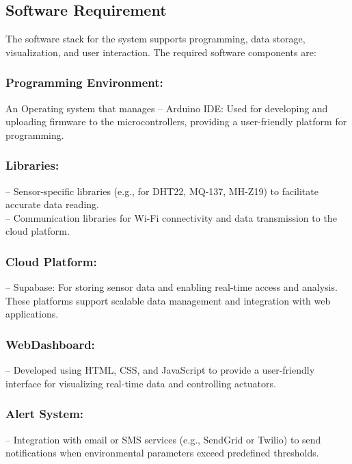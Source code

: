 \documentclass[../main.tex]{subfiles}
\begin{document}
\subsection{Software Requirement}  The software stack for the system supports programming, data storage, visualization, and user interaction. The required software components are:
    \subsubsection{Programming Environment:} An Operating system that manages – Arduino IDE: Used for developing and uploading firmware to the microcontrollers, providing a user-friendly platform for programming.

    \subsubsection{Libraries:}
    – Sensor-specific libraries (e.g., for DHT22, MQ-137, MH-Z19) to facilitate accurate
 data reading.\\
 – Communication libraries for Wi-Fi connectivity and data transmission to the cloud
 platform.

    \subsubsection{Cloud Platform:}
    – Supabase: For storing sensor data and enabling real-time access and
 analysis. These platforms support scalable data management and integration with
 web applications.
 \subsubsection{WebDashboard:}
 – Developed using HTML, CSS, and JavaScript to provide a user-friendly interface for visualizing real-time data and controlling actuators.
\subsubsection{Alert System:}
– Integration with email or SMS services (e.g., SendGrid or Twilio) to send notifications when environmental parameters exceed predefined thresholds.
 
\end{document}
